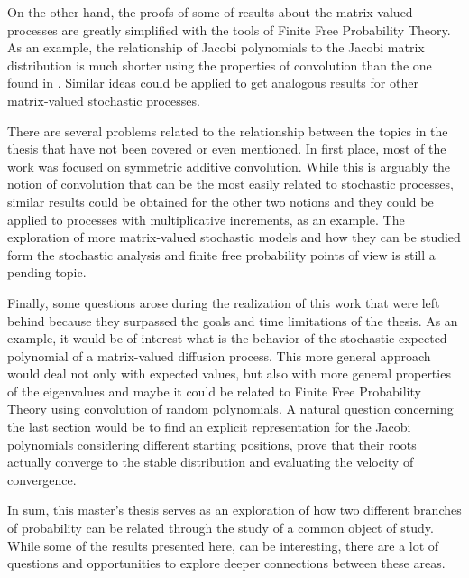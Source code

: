 On the other hand, the proofs of some of results about the matrix-valued processes are greatly simplified with the tools of Finite Free Probability Theory. As an example, the relationship of Jacobi polynomials to the Jacobi matrix distribution is much shorter using the properties of convolution than the one found in \cite{article:aomoto1987jacobi_selberg_integrals}. Similar ideas could be applied to get analogous results for other matrix-valued stochastic processes. 

There are several problems related to the relationship between the topics in the thesis that have not been covered or even mentioned. In first place, most of the work was focused on symmetric additive convolution. While this is arguably the notion of convolution that can be the most easily related to stochastic processes, similar results could be obtained for the other two notions and they could be applied to processes with multiplicative increments, as an example. The exploration of more matrix-valued stochastic models and how they can be studied form the stochastic analysis and finite free probability points of view is still a pending topic. 

Finally, some questions arose during the realization of this work that were left behind because they surpassed the goals and time limitations of the thesis. As an example, it would be of interest what is the behavior of the stochastic expected polynomial of a matrix-valued diffusion process. This more general approach would deal not only with expected values, but also with more general properties of the eigenvalues and maybe it could be related to Finite Free Probability Theory using convolution of random polynomials.  A natural question concerning the last section would be to find an explicit representation for the Jacobi polynomials considering different starting positions, prove that their roots actually converge to the stable distribution and evaluating the velocity of convergence.

In sum, this master's thesis serves as an exploration of how two different branches of probability can be related through the study of a common object of study. While some of the results presented here, can be interesting, there are a lot of questions and opportunities to explore deeper connections between these areas.